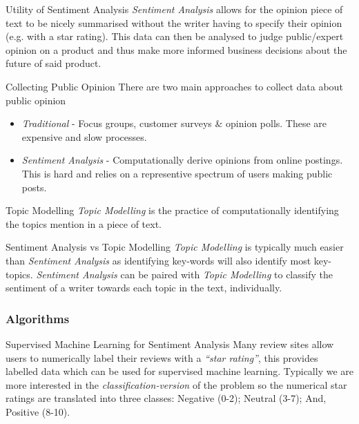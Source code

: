 \documentclass[11pt,a4paper]{article}
\begin{document}
  \begin{remark}{Utility of Sentiment Analysis}
    \textit{Sentiment Analysis} allows for the opinion piece of text to be nicely summarised without the writer having to specify their opinion (e.g. with a star rating). This data can then be analysed to judge public/expert opinion on a product and thus make more informed business decisions about the future of said product.
  \end{remark}

  \begin{proposition}{Collecting Public Opinion}
    There are two main approaches to collect data about public opinion
    \begin{itemize}
      \item \textit{Traditional} - Focus groups, customer surveys \& opinion polls. These are expensive and slow processes.
      \item \textit{Sentiment Analysis} - Computationally derive opinions from online postings. This is hard and relies on a representive spectrum of users making public posts.
    \end{itemize}
  \end{proposition}

  \begin{definition}{Topic Modelling}
    \textit{Topic Modelling} is the practice of computationally identifying the topics mention in a piece of text.
  \end{definition}

  \begin{remark}{Sentiment Analysis vs Topic Modelling}
    \textit{Topic Modelling} is typically much easier than \textit{Sentiment Analysis} as identifying key-words will also identify most key-topics. \textit{Sentiment Analysis} can be paired with \textit{Topic Modelling} to classify the sentiment of a writer towards each topic in the text, individually.
  \end{remark}

\subsubsection{Algorithms} \label{sec_SentimentAnalysisAlgorithms}

  \begin{remark}{Supervised Machine Learning for Sentiment Analysis}
    Many review sites allow users to numerically label their reviews with a \textit{``star rating''}, this provides labelled data which can be used for supervised machine learning. Typically we are more interested in the \textit{classification-version} of the problem so the numerical star ratings are translated into three classes: Negative (0-2); Neutral (3-7); And, Positive (8-10).
  \end{remark}
\end{document}
